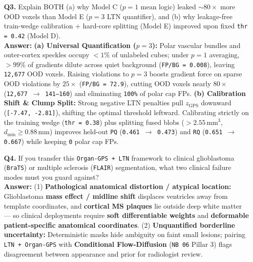 \documentclass[10pt,a4paper]{article}
\begin{document}
\begin{qabox}
\textbf{Q3.} Explain BOTH (a) why Model C ($p=1$ mean logic) leaked $\sim 80\times$ more OOD voxels than Model E ($p=3$ LTN quantifier), and (b) why leakage-free train-wedge calibration + hard-core splitting (Model E) improved upon fixed \texttt{thr = 0.42} (Model D).\\[3pt]
\textbf{Answer:} \textbf{(a) Universal Quantification ($p=3$):} Polar vascular bundles and outer-cortex speckles occupy $<1\%$ of unlabeled cubes; under $p=1$ averaging, $>99\%$ of gradients dilute across quiet background (\texttt{FP/BG = 0.008}), leaving \texttt{12,677} OOD voxels. Raising violations to $p=3$ boosts gradient force on sparse OOD violations by $25\times$ (\texttt{FP/BG = 72.9}), cutting OOD voxels nearly $80\times$ (\texttt{12,677 $\to$ 141--160}) and eliminating \texttt{100\%} of polar cap FPs. \textbf{(b) Calibration Shift \& Clump Split:} Strong negative LTN penalties pull $z_{\text{GPS}}$ downward (\texttt{[-7.47, -2.81]}), shifting the optimal threshold leftward. Calibrating strictly on the training wedge (\texttt{thr = 0.38}) plus splitting fused blobs ($>2.55\,\text{mm}^3$, $d_{\min} \ge 0.88\,\text{mm}$) improves held-out \texttt{PQ} (\texttt{0.461 $\to$ 0.473}) and \texttt{RQ} (\texttt{0.651 $\to$ 0.667}) while keeping \texttt{0} polar cap FPs.
\end{qabox}

\begin{qabox}
\textbf{Q4.} If you transfer this \texttt{Organ-GPS + LTN} framework to clinical glioblastoma (\texttt{BraTS}) or multiple sclerosis (\texttt{FLAIR}) segmentation, what two clinical failure modes must you guard against?\\[3pt]
\textbf{Answer:} (1) \textbf{Pathological anatomical distortion / atypical location:} Glioblastoma \textbf{mass effect / midline shift} displaces ventricles away from template coordinates, and \textbf{cortical MS plaques} lie outside deep white matter --- so clinical deployments require \textbf{soft differentiable weights} and \textbf{deformable patient-specific anatomical coordinates}. (2) \textbf{Unquantified borderline uncertainty:} Deterministic masks hide ambiguity on faint small lesions; pairing \texttt{LTN + Organ-GPS} with \textbf{Conditional Flow-Diffusion} (\texttt{NB 06} Pillar 3) flags disagreement between appearance and prior for radiologist review.
\end{qabox}
\end{document}

